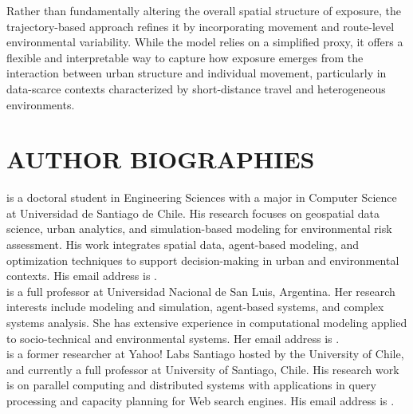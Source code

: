 \documentclass{wscpaperproc}
\theoremstyle{wsc}
\begin{document}
Rather than fundamentally altering the overall spatial structure of exposure, the trajectory-based approach refines it by incorporating movement and route-level environmental variability. While the model relies on a simplified proxy, it offers a flexible and interpretable way to capture how exposure emerges from the interaction between urban structure and individual movement, particularly in data-scarce contexts characterized by short-distance travel and heterogeneous environments.



\footnotesize






\section*{AUTHOR BIOGRAPHIES}

 is a doctoral student in Engineering Sciences with a major in Computer Science at Universidad de Santiago de Chile. His research focuses on geospatial data science, urban analytics, and simulation-based modeling for environmental risk assessment. His work integrates spatial data, agent-based modeling, and optimization techniques to support decision-making in urban and environmental contexts. His email address is .\\

 is a full professor  at Universidad Nacional de San Luis, Argentina. Her research interests include modeling and simulation, agent-based systems, and complex systems analysis. She has extensive experience in computational modeling applied to socio-technical and environmental systems. Her email address is .\\

 is a former researcher at Yahoo! Labs Santiago hosted by the University of Chile, and currently a
full professor at University of Santiago, Chile.  His research work is on parallel computing and distributed systems with applications in query
processing and capacity planning for Web search engines. His email address is .
\end{document}
